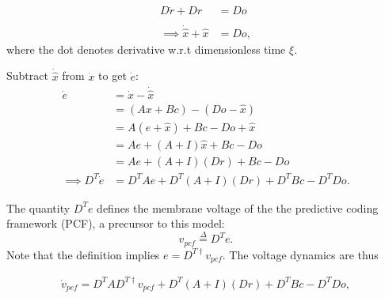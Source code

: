 \begin{enumerate}
    \begin{align*}
        D \dot{r} + D r &= Do \\
        \\
        \implies \dot{\hat{x}} + \hat{x} &= Do,
    \end{align*}
    where the dot denotes derivative w.r.t dimensionless time $\xi$.

    Subtract $\dot{\hat{x}}$ from $\dot{x}$ to get $\dot{e}$:
	\begin{align*}
        \dot{e} &= \dot{x}-\dot{\hat{x}} \\
        &= \left( Ax + Bc \right) - \left( Do - \hat{x} \right) \\
        &= A\left(  e + \hat{x} \right) + Bc - Do + \hat{x} \\
        &= A e + (A + I)\hat{x} + Bc - Do \\
        &=  A e + (A + I) \left(Dr\right) + Bc - Do  \\
        \implies D^T \dot{e} &= D^T A e + D^T (A + I) \left(Dr\right) + D^T Bc - D^T Do. 
	\end{align*} 
	
The quantity $D^T e$ defines the membrane voltage of the the predictive coding framework (PCF), a precursor to this model:
$$
	v_{pcf} \overset{\Delta}{=}  D^T e.
$$
Note that the definition implies $e = D^{T \dagger} v_{pcf}$. 
The voltage dynamics are thus

\begin{align}
\label{eq:derivation_init}
\dot{v}_{pcf} 
= 
D^T A D^{T \dagger} v_{pcf} + D^T (A + I) \left(Dr\right) + D^T Bc - D^T Do,
\end{align}


\end{enumerate}
